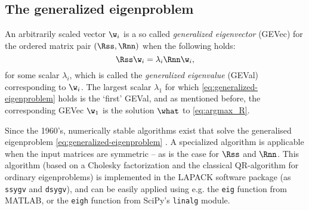 \subsection{The generalized eigenproblem}
\label{sec:generalized-eigenproblem}

An arbitrarily scaled vector $\w_i$ is a so called \emph{generalized eigenvector} (GEVec) for the ordered matrix pair $(\Rss, \Rnn)$ when the following holds:
%
\begin{equation}
\label{eq:generalized-eigenproblem}
\Rss \w_i = \lambda_i \Rnn \w_i,
\end{equation}
%
for some scalar $\lambda_i$, which is called the \emph{generalized eigenvalue} (GEVal) corresponding to $\w_i$. The largest scalar $\lambda_1$ for which \cref{eq:generalized-eigenproblem} holds is the `first' GEVal, and as mentioned before, the corresponding GEVec $\w_1$ is the solution $\what$ to \cref{eq:argmax_R}.

Since the 1960's, numerically stable algorithms exist that solve the generalised eigenproblem \cref{eq:generalized-eigenproblem} \cite{Golub2013}. A specialized algorithm is applicable when the input matrices are symmetric -- as is the case for $\Rss$ and $\Rnn$. This algorithm (based on a Cholesky factorization and the classical QR-algorithm for ordinary eigenproblems) is implemented in the LAPACK software package (as \texttt{ssygv} and \texttt{dsygv}), and can be easily applied using e.g. the \texttt{eig} function from MATLAB, or the \texttt{eigh} function from SciPy's \texttt{linalg} module.
